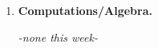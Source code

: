 \documentclass[11pt,letterpaper]{article}
\begin{document}
\begin{enumerate}
\begin{enumerate}
\end{enumerate}
\item \textbf{Computations/Algebra.} 

\it -none this week-

\end{enumerate}
\end{document}
